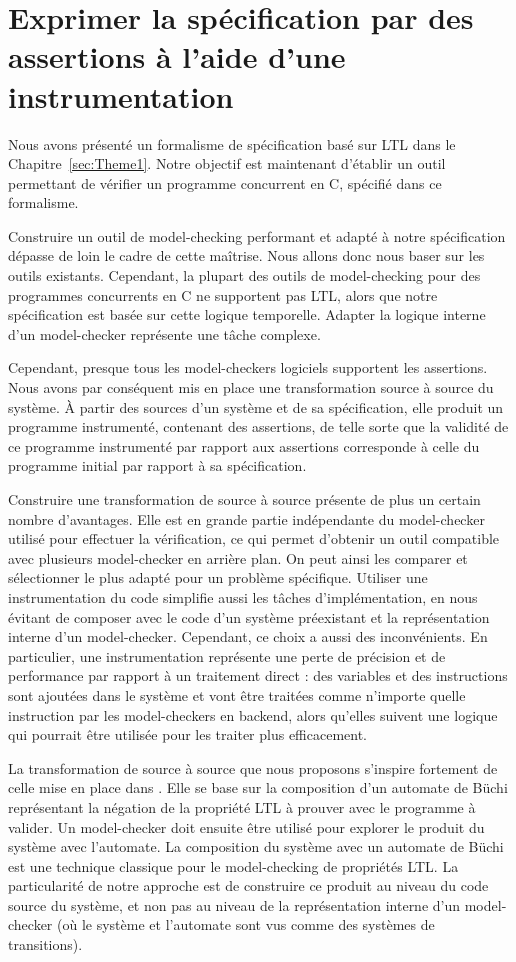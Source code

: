 \chapter{Exprimer la spécification par des assertions à l'aide d'une
instrumentation}\label{sec:Theme2}

Nous avons présenté un formalisme de spécification basé sur \ac{LTL} dans le
Chapitre~\ref{sec:Theme1}. Notre objectif est maintenant d'établir un outil
permettant de vérifier un programme concurrent en C, spécifié dans ce
formalisme.

Construire un outil de model-checking performant et adapté à notre spécification
dépasse de loin le cadre de cette maîtrise. Nous allons donc nous baser sur les
outils existants. Cependant, la plupart des outils de model-checking pour des
programmes concurrents en C ne supportent pas \ac{LTL}, alors que notre
spécification est basée sur cette logique temporelle. Adapter la logique interne
d'un model-checker représente une tâche complexe.

Cependant, presque tous les model-checkers logiciels supportent les assertions.
Nous avons par conséquent mis en place une transformation source à source du
système. À partir des sources d'un système et de sa spécification, elle produit
un programme instrumenté, contenant des assertions, de telle sorte que la validité de ce
programme instrumenté par rapport aux assertions corresponde à celle du
programme initial par rapport à sa spécification.

Construire une transformation de source à source présente de plus un certain
nombre d'avantages. Elle est en grande partie indépendante du model-checker
utilisé pour effectuer la vérification, ce qui permet d'obtenir un outil
compatible avec plusieurs model-checker en arrière plan. On peut ainsi les
comparer et sélectionner le
plus adapté pour un problème spécifique. Utiliser une instrumentation du code
simplifie aussi les tâches d'implémentation, en nous évitant de composer avec le
code d'un système préexistant et la représentation interne d'un model-checker.
Cependant, ce choix a aussi des inconvénients. En particulier, une
instrumentation représente une perte de précision et de performance par rapport
à un traitement direct : des variables et des instructions sont ajoutées dans le
système et vont être traitées comme n'importe quelle instruction par les
model-checkers en backend, alors qu'elles suivent une logique qui pourrait être
utilisée pour les traiter plus efficacement.

La transformation de source à source que nous proposons s'inspire fortement de
celle mise en place dans \cite{morse_ltl}. Elle se base sur la composition d'un
automate de Büchi représentant la négation de la propriété \ac{LTL} à prouver
avec le programme à valider. Un model-checker doit ensuite être utilisé pour
explorer le produit du système avec l'automate. La composition du système avec
un automate de Büchi est une technique classique pour le model-checking de
propriétés LTL\cite{25_years_of_model_checking}. La particularité de notre
approche est de construire ce produit au niveau du code source du système, et
non pas au niveau de la représentation interne d'un model-checker (où le système
et l'automate sont vus comme des systèmes de transitions).


